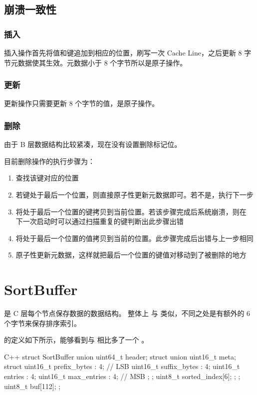 \documentclass{mydoc}
\begin{document}
\subsection{崩溃一致性}

\subsubsection{插入}

插入操作首先将值和键追加到相应的位置，刷写一次 Cache Line，之后更新
8 字节元数据使其生效。元数据小于 8 个字节所以是原子操作。

\subsubsection{更新}

更新操作只需要更新 8 个字节的值，是原子操作。

\subsubsection{删除}

由于 B 层数据结构比较紧凑，现在没有设置删除标记位。

目前删除操作的执行步骤为：

\begin{enumerate}
  \item 查找该键对应的位置
  \item 若键处于最后一个位置，则直接原子性更新元数据即可。若不是，执行下一步
  \item 将处于最后一个位置的键拷贝到当前位置。若该步骤完成后系统崩溃，则在
        下一次启动时可以通过扫描重复的键判断出此步骤出错
  \item 将处于最后一个位置的值拷贝到当前的位置。此步骤完成后出错与上一步相同
  \item 原子性更新元数据，这样就把最后一个位置的键值对移动到了被删除的地方
\end{enumerate}

\section{SortBuffer}

 是 C 层每个节点保存数据的数据结构。 整体上
与  类似，不同之处是有额外的 6 个字节来保存排序索引。

 的定义如下所示，能够看到与  相比多了一个
。

\begin{codes}{C++}
struct SortBuffer {
  union {
    uint64_t header;
    struct {
      union {
        uint16_t meta;
        struct {
          uint16_t prefix_bytes : 4;  // LSB
          uint16_t suffix_bytes : 4;
          uint16_t entries      : 4;
          uint16_t max_entries  : 4;  // MSB
        };
      };
      uint8_t sorted_index[6];
    };
  };
  uint8_t buf[112];
};
\end{codes}
\end{document}

